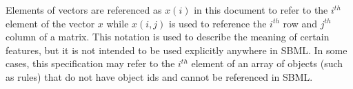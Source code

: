 Elements of vectors are referenced as $x(i)$ in this document to refer to the  $i^{th}$ element of the vector $x$ while $x(i,j)$ is used to reference the $i^{th}$ row and $j^{th}$ column of a matrix.
This notation is used to describe the meaning of certain features, but it is not intended to be used explicitly anywhere in SBML. 
In some cases, this specification may refer to the $i^{th}$ element of an array of objects (such as rules) that do not have object ids and cannot be referenced in SBML. 



